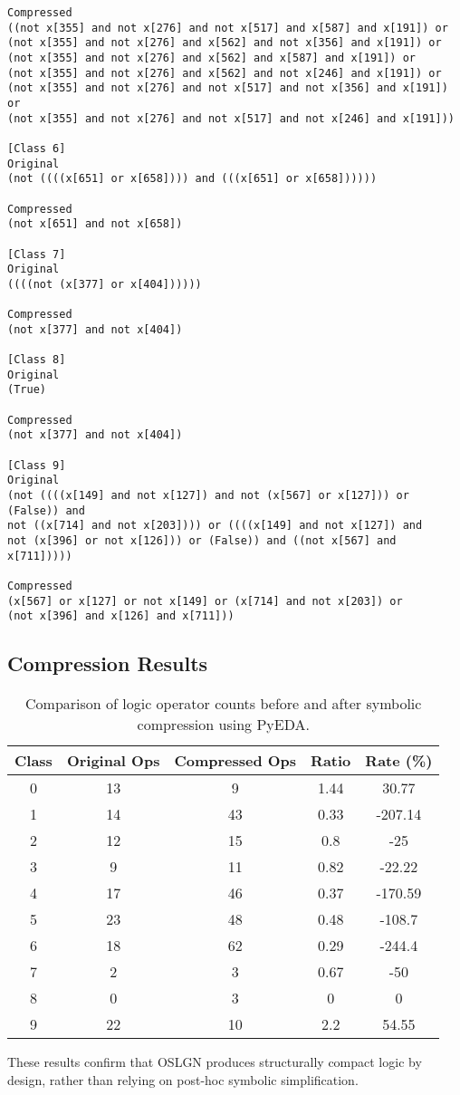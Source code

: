 \begin{verbatim}
Compressed
((not x[355] and not x[276] and not x[517] and x[587] and x[191]) or 
(not x[355] and not x[276] and x[562] and not x[356] and x[191]) or 
(not x[355] and not x[276] and x[562] and x[587] and x[191]) or 
(not x[355] and not x[276] and x[562] and not x[246] and x[191]) or 
(not x[355] and not x[276] and not x[517] and not x[356] and x[191]) or 
(not x[355] and not x[276] and not x[517] and not x[246] and x[191]))

[Class 6]
Original
(not ((((x[651] or x[658]))) and (((x[651] or x[658])))))

Compressed
(not x[651] and not x[658])

[Class 7]
Original
((((not (x[377] or x[404])))))

Compressed
(not x[377] and not x[404])

[Class 8]
Original   
(True)

Compressed 
(not x[377] and not x[404])

[Class 9]
Original
(not ((((x[149] and not x[127]) and not (x[567] or x[127])) or (False)) and 
not ((x[714] and not x[203]))) or ((((x[149] and not x[127]) and 
not (x[396] or not x[126])) or (False)) and ((not x[567] and x[711]))))

Compressed
(x[567] or x[127] or not x[149] or (x[714] and not x[203]) or 
(not x[396] and x[126] and x[711]))

\end{verbatim}
\subsection{Compression Results}

\begin{table}[H]
    \caption{Comparison of logic operator counts before and after symbolic compression using PyEDA.}
    \label{tab:symbolic_compression}
    \centering
    \small
    \begin{tabular}{c|cccc}
        \toprule
        \textbf{Class} & \textbf{Original Ops} & \textbf{Compressed Ops} & \textbf{Ratio} & \textbf{Rate (\%)} \\
        \midrule
        0 & 13 & 9 & 1.44 & 30.77 \\
        1 & 14 & 43 & 0.33 & -207.14 \\
        2 & 12 & 15 & 0.8 & -25 \\
        3 & 9 & 11 & 0.82 & -22.22 \\
        4 & 17 & 46 & 0.37 & -170.59 \\
        5 & 23 & 48 & 0.48 & -108.7 \\
        6 & 18 & 62 & 0.29 & -244.4 \\
        7 & 2 & 3 & 0.67 & -50 \\
        8 & 0 & 3 & 0 & 0 \\
        9 & 22 & 10 & 2.2 & 54.55 \\
        \bottomrule
    \end{tabular}

\end{table}

\noindent These results confirm that OSLGN produces structurally compact logic by design, rather than relying on post-hoc symbolic simplification.
